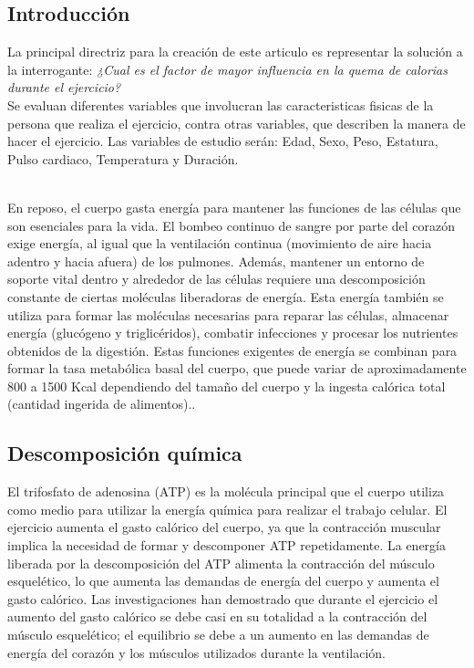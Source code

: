 \documentclass[5p,times,authoryear]{sciarticle}
\begin{document}
\begin{multicols}{2}   %


\section{Introducción}
La principal directriz para la creación de este articulo es representar la solución a la interrogante:
\emph {¿Cual es el factor de mayor influencia en la quema de calorias durante el ejercicio? }\\  


Se evaluan diferentes variables que involucran las caracteristicas fisicas de la persona que realiza el ejercicio, contra otras variables, que describen la manera de hacer el ejercicio.
Las variables de estudio serán: Edad, Sexo, Peso, Estatura, Pulso cardiaco, Temperatura y Duración.

\\

{En reposo, el cuerpo gasta energía para mantener las funciones de las células que son esenciales para la vida. El bombeo continuo de sangre por parte del corazón exige energía, al igual que la ventilación continua (movimiento de aire hacia adentro y hacia afuera) de los pulmones. Además, mantener un entorno de soporte vital dentro y alrededor de las células requiere una descomposición constante de ciertas moléculas liberadoras de energía. Esta energía también se utiliza para formar las moléculas necesarias para reparar las células, almacenar energía (glucógeno y triglicéridos), combatir infecciones y procesar los nutrientes obtenidos de la digestión. Estas funciones exigentes de energía se combinan para formar la tasa metabólica basal del cuerpo, que puede variar de aproximadamente 800 a 1500 Kcal dependiendo del tamaño del cuerpo y la ingesta calórica total (cantidad ingerida de alimentos).}.


\subsection{Descomposición química}


El trifosfato de adenosina (ATP) es la molécula principal que el cuerpo utiliza como medio para utilizar la energía química para realizar el trabajo celular. El ejercicio aumenta el gasto calórico del cuerpo, ya que la contracción muscular implica la necesidad de formar y descomponer ATP repetidamente. La energía liberada por la descomposición del ATP alimenta la contracción del músculo esquelético, lo que aumenta las demandas de energía del cuerpo y aumenta el gasto calórico. Las investigaciones han demostrado que durante el ejercicio el aumento del gasto calórico se debe casi en su totalidad a la contracción del músculo esquelético; el equilibrio se debe a un aumento en las demandas de energía del corazón y los músculos utilizados durante la ventilación.



\end{multicols}
\end{document}
